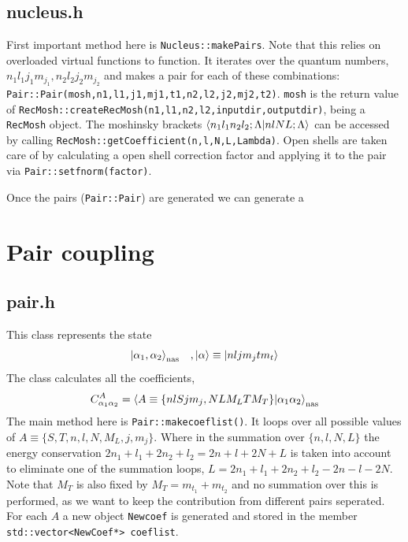 \documentclass[10pt]{article}
\begin{document}
\subsection{nucleus.h}
First important method here is \texttt{Nucleus::makePairs}. Note that this relies on overloaded virtual functions to function. It iterates over the quantum numbers, $n_1 l_1 j_1 m_{j_1}, n_2 l_2 j_2 m_{j_2}$ and makes a pair for each of these combinations: \texttt{Pair::Pair(mosh,n1,l1,j1,mj1,t1,n2,l2,j2,mj2,t2)}. \texttt{mosh} is the return value of \texttt{RecMosh::createRecMosh(n1,l1,n2,l2,inputdir,outputdir)}, being a \texttt{RecMosh} object. The moshinsky brackets $\braket{n_1 l_1 n_2 l_2; \Lambda | n l N L ; \Lambda}$ can be accessed by calling \texttt{RecMosh::getCoefficient(n,l,N,L,Lambda)}.
Open shells are taken care of by calculating a open shell correction factor and applying it to the pair via \texttt{Pair::setfnorm(factor)}.

Once the pairs (\texttt{Pair::Pair}) are generated we can generate a 



\section{Pair coupling}
\subsection{pair.h}
This class represents the state
\begin{align}
	\ket{ \alpha_1, \alpha_2}_{\textrm{nas}} \;\;\;, \ket{\alpha} \equiv \ket{n l j m_j t m_t}
\end{align}
The class calculates all the coefficients,
\begin{align}
	C_{\alpha_1 \alpha_2}^{A} = \braket{A \equiv \{ n l S j m_j, N L M_L T M_T\} | \alpha_1 \alpha_2}_{\text{nas}}
	\label{eq:coef}
\end{align}
The main method here is \texttt{Pair::makecoeflist()}. It loops over all possible values of $ A \equiv \{ S,T,n,l,N,M_L,j,m_j \}$. Where in the summation over $\{n,l,N,L\}$ the energy conservation $2n_1 + l_1 + 2n_2 + l_2 = 2n + l + 2N + L$ is taken into account to eliminate one of the summation loops, $L = 2n_1 + l_1 + 2n_2 + l_2 - 2n - l - 2N$. Note that $M_T$ is also fixed by $M_T = m_{t_1} + m_{t_2}$ and no summation over this is performed, as we want to keep the contribution from different pairs seperated.
For each $A$ a new object \texttt{Newcoef} is generated and stored in the member \texttt{std::vector<NewCoef*> coeflist}.
\end{document}
